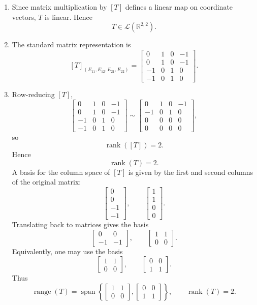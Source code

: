 \documentclass[12pt]{article}
\newcommand{\R}{\mathbb{R}}
\newcommand{\cL}{\mathcal{L}}
\DeclareMathOperator{\Range}{range}
\DeclareMathOperator{\Rank}{rank}
\DeclareMathOperator{\rank}{rank}
\begin{document}
\begin{enumerate}[label=(\alph*)]
\item Since matrix multiplication by \([T]\) defines a linear map on coordinate vectors, \(T\) is linear. Hence
\[
T\in\cL(\R^{2,2}).
\]

\item The standard matrix representation is
\[
\boxed{
[T]_{(E_{11},E_{12},E_{21},E_{22})}
=
\begin{bmatrix}
0&1&0&-1\\
0&1&0&-1\\
-1&0&1&0\\
-1&0&1&0
\end{bmatrix}.}
\]

\item Row-reducing \([T]\),
\[
\begin{bmatrix}
0&1&0&-1\\
0&1&0&-1\\
-1&0&1&0\\
-1&0&1&0
\end{bmatrix}
\sim
\begin{bmatrix}
0&1&0&-1\\
-1&0&1&0\\
0&0&0&0\\
0&0&0&0
\end{bmatrix},
\]
so
\[
\rank([T])=2.
\]
Hence
\[
\Rank(T)=2.
\]
A basis for the column space of \([T]\) is given by the first and second columns of the original matrix:
\[
\begin{bmatrix}0\\0\\-1\\-1\end{bmatrix},
\qquad
\begin{bmatrix}1\\1\\0\\0\end{bmatrix}.
\]
Translating back to matrices gives the basis
\[
\begin{bmatrix}0&0\\-1&-1\end{bmatrix},
\qquad
\begin{bmatrix}1&1\\0&0\end{bmatrix}.
\]
Equivalently, one may use the basis
\[
\begin{bmatrix}1&1\\0&0\end{bmatrix},
\qquad
\begin{bmatrix}0&0\\1&1\end{bmatrix}.
\]
Thus
\[
\boxed{
\Range(T)=
\operatorname{span}\left\{
\begin{bmatrix}1&1\\0&0\end{bmatrix},
\begin{bmatrix}0&0\\1&1\end{bmatrix}
\right\},
\qquad
\Rank(T)=2.}
\]


\end{enumerate}
\end{document}
